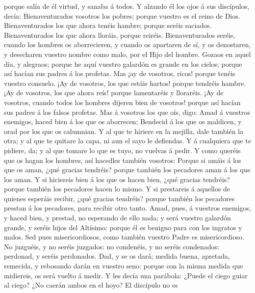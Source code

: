 porque salía de él virtud, y sanaba á todos.  Y alzando él
los ojos á sus discípulos, decía: Bienaventurados vosotros los pobres;
porque vuestro es el reino de Dios.  Bienaventurados los
que ahora tenéis hambre; porque seréis saciados. Bienaventurados los que
ahora lloráis, porque reiréis.  Bienaventurados seréis,
cuando los hombres os aborrecieren, y cuando os apartaren de sí, y os
denostaren, y desecharen vuestro nombre como malo, por el Hijo del
hombre.  Gozaos en aquel día, y alegraos; porque he aquí
vuestro galardón es grande en los cielos; porque así hacían sus padres á
los profetas.  Mas ¡ay de vosotros, ricos! porque tenéis
vuestro consuelo.  ¡Ay de vosotros, los que estáis hartos!
porque tendréis hambre. ¡Ay de vosotros, los que ahora reís! porque
lamentaréis y lloraréis.  ¡Ay de vosotros, cuando todos los
hombres dijeren bien de vosotros! porque así hacían sus padres á los
falsos profetas.  Mas á vosotros los que oís, digo: Amad á
vuestros enemigos, haced bien á los que os aborrecen; 
Bendecid á los que os maldicen, y orad por los que os calumnian.
 Y al que te hiriere en la mejilla, dale también la otra; y
al que te quitare la capa, ni aun el sayo le defiendas.  Y
á cualquiera que te pidiere, da; y al que tomare lo que es tuyo, no
vuelvas á pedir.  Y como queréis que os hagan los hombres,
así hacedles también vosotros:  Porque si amáis á los que
os aman, ¿qué gracias tendréis? porque también los pecadores aman á los
que los aman.  Y si hiciereis bien á los que os hacen bien,
¿qué gracias tendréis? porque también los pecadores hacen lo mismo.
 Y si prestareis á aquellos de quienes esperáis recibir,
¿qué gracias tendréis? porque también los pecadores prestan á los
pecadores, para recibir otro tanto.  Amad, pues, á vuestros
enemigos, y haced bien, y prestad, no esperando de ello nada; y será
vuestro galardón grande, y seréis hijos del Altísimo: porque él es
benigno para con los ingratos y malos.  Sed pues
misericordiosos, como también vuestro Padre es misericordioso.
 No juzguéis, y no seréis juzgados: no condenéis, y no
seréis condenados: perdonad, y seréis perdonados.  Dad, y
se os dará; medida buena, apretada, remecida, y rebosando darán en
vuestro seno: porque con la misma medida que midiereis, os será vuelto á
medir.  Y les decía una parábola: ¿Puede el ciego guiar al
ciego? ¿No caerán ambos en el hoyo?  El discípulo no es
